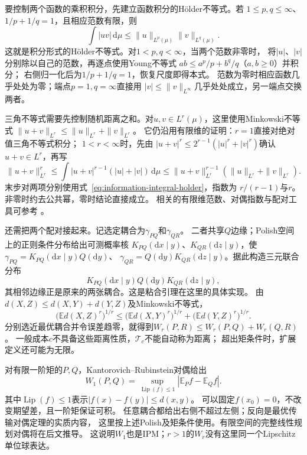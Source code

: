 要控制两个函数的乘积积分，先建立函数积分的Hölder不等式。若
\(1\leq p,q\leq\infty\)、\(1/p+1/q=1\)，且相应范数有限，则
\begin{equation}
 \int|uv|\,\mathrm d\mu\leq
 \|u\|_{L^p(\mu)}\|v\|_{L^q(\mu)}.
 \label{eq:information-integral-holder}
\end{equation}
这就是积分形式的Hölder不等式。对\(1<p,q<\infty\)，当两个范数非零时，
将\(|u|\)、\(|v|\)分别除以自己的范数，再逐点使用Young不等式
\(ab\leq a^p/p+b^q/q\)（\(a,b\geq0\)）并积分；
右侧归一化后为\(1/p+1/q=1\)，恢复尺度即得本式。
范数为零时相应函数几乎处处为零；端点\(p=1,q=\infty\)直接用
\(|v|\leq\|v\|_{L^\infty}\)几乎处处成立，另一端点交换两者。

三角不等式需要先控制随机距离之和。对\(u,v\in L^r(\mu)\)，这里使用Minkowski不等式
\(\|u+v\|_{L^r}\leq\|u\|_{L^r}+\|v\|_{L^r}\)。
它仍沿用有限维的证明：\(r=1\)直接对绝对值三角不等式积分；
\(1<r<\infty\)时，先由
\(|u+v|^r\leq2^{r-1}(|u|^r+|v|^r)\)确认\(u+v\in L^r\)，再写
\[
 \|u+v\|_{L^r}^r
 \leq\int|u+v|^{r-1}(|u|+|v|)\,\mathrm d\mu
 \leq\|u+v\|_{L^r}^{r-1}(\|u\|_{L^r}+\|v\|_{L^r}).
\]
末步对两项分别使用式~\eqref{eq:information-integral-holder}，指数为
\(r/(r-1)\)与\(r\)。非零时约去公共幂，零时结论直接成立。
相关的有限维范数、对偶指数与配对工具可参考
。

还需把两个配对接起来。记选定耦合为\(\gamma_{PQ}\)和\(\gamma_{QR}\)。
二者共享\(Q\)边缘；Polish空间上的正则条件分布给出可测概率核
\(K_{PQ}(\mathrm dx\mid y)\)、\(K_{QR}(\mathrm dz\mid y)\)，使
\(\gamma_{PQ}=K_{PQ}(\mathrm dx\mid y)Q(\mathrm dy)\)、
\(\gamma_{QR}=Q(\mathrm dy)K_{QR}(\mathrm dz\mid y)\)。据此构造三元联合分布
\[
  K_{PQ}(\mathrm dx\mid y)Q(\mathrm dy)K_{QR}(\mathrm dz\mid y),
\]
其相邻边缘正是原来的两张耦合。这是粘合引理在这里的具体实现。
由\(d(X,Z)\leq d(X,Y)+d(Y,Z)\)及Minkowski不等式，
\[
  \bigl(\mathbb E d(X,Z)^r\bigr)^{1/r}
  \leq\bigl(\mathbb E d(X,Y)^r\bigr)^{1/r}
       +\bigl(\mathbb E d(Y,Z)^r\bigr)^{1/r}.
\]
分别选近最优耦合并令误差趋零，就得到\(W_r(P,R)\leq W_r(P,Q)+W_r(Q,R)\)。
一般成本\(c\)不具备这些距离性质，\(\mathcal T_c\)不能自动称为距离；
超出矩条件时，扩展定义还可能为无限。

对有限一阶矩的\(P,Q\)，Kantorovich--Rubinstein对偶给出
\begin{equation}
  W_1(P,Q)=\sup_{\operatorname{Lip}(f)\leq1}
                         |\mathbb E_Pf-\mathbb E_Qf|.
  \label{eq:information-kr-duality}
\end{equation}
其中\(\operatorname{Lip}(f)\leq1\)表示\(|f(x)-f(y)|\leq d(x,y)\)。
可以固定\(f(x_0)=0\)，不改变期望差，且一阶矩保证可积。
任意耦合都给出右侧不超过左侧；反向是最优传输对偶定理的实质内容，
这里按上述Polish及矩条件使用。有限空间的完整线性规划对偶将在后文推导。
这说明\(W_1\)也是IPM；\(r>1\)的\(W_r\)没有这里同一个Lipschitz单位球表达。

